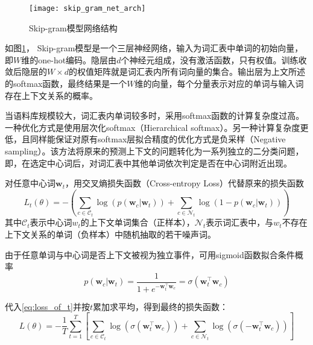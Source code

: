 \begin{figure}[htp]
\centering
\texttt{[image: skip\_gram\_net\_arch]}
\caption{Skip-gram模型网络结构}
\label{fig:skip_gram_net_arch}
\end{figure}
如图\ref{fig:skip_gram_net_arch}，
Skip-gram模型是一个三层神经网络，输入为词汇表中单词的初始向量，即$W$维的one-hot编码。隐层由$d$个神经元组成，没有激活函数，只有权值。训练收敛后隐层的$W\times d$的权值矩阵就是词汇表内所有词向量的集合。输出层为上文所述的softmax函数，最终结果是一个$W$维的向量，每个分量表示对应的单词与输入词存在上下文关系的概率。

当语料库规模较大，词汇表内单词较多时，采用softmax函数的计算复杂度过高。一种优化方式是使用层次化softmax（Hierarchical softmax）\cite{Hierarchical_softmax}。另一种计算复杂度更低，且同样能保证对原有softmax层拟合精度的优化方式是负采样（Negative sampling）。该方法将原来的预测上下文的问题转化为一系列独立的二分类问题，即，在选定中心词后，对词汇表中其他单词依次判定是否在中心词附近出现。


对任意中心词$\mathbf{w}_t$，用交叉熵损失函数（Cross-entropy Loss）代替原来的损失函数
\begin{equation}
    \label{eq:loss_of_t}
    L_t(\theta) = -\left( 
        \sum_{c \in \mathcal{C}_t} \log(p(\mathbf{w}_c | \mathbf{w}_t))+\sum_{c \in \mathcal{N}_t} \log(1-p(\mathbf{w}_c | \mathbf{w}_t)) 
    \right)
\end{equation}
其中$\mathcal{C}_t$表示中心词$w_t$的上下文单词集合（正样本），$\mathcal{N}_t$表示词汇表中，与$w_t$不存在上下文关系的单词（负样本）中随机抽取的若干噪声词。

由于任意单词与中心词是否上下文被视为独立事件，可用sigmoid函数拟合条件概率
\begin{equation}
    p(\mathbf{w}_c | \mathbf{w}_t) = \frac{1}{1+e^{-\mathbf{w}_t^{\top} \mathbf{w}_c}} = \sigma(\mathbf{w}_t^{\top} \mathbf{w}_c)
\end{equation}

代入\ref{eq:loss_of_t}并按$t$累加求平均，得到最终的损失函数：
\begin{equation}
    L(\theta) = -\frac{1}{T}\sum_{t=1}^{T} \left[
        \sum_{c \in \mathcal{C}_t} \log(\sigma(\mathbf{w}_t^{\top} \mathbf{w}_c)) + \sum_{c \in \mathcal{N}_t} \log(\sigma(-\mathbf{w}_t^{\top} \mathbf{w}_c))
    \right]
\end{equation}


%
%

